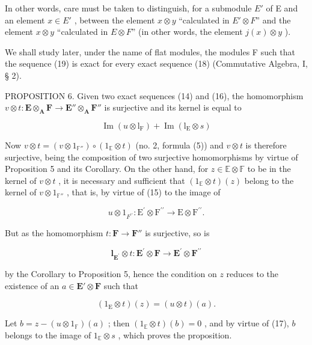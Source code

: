 In other words, care must be taken to distinguish, for a submodule \(E'\) of E and an element \(x \in E'\) , between the element \(x \otimes y\) ``calculated in \(E' \otimes F\)'' and the element \(x \otimes y\) ``calculated in \(E \otimes F\)'' (in other words, the element \(j(x) \otimes y\) ).

We shall study later, under the name of flat modules, the modules F such that the sequence (19) is exact for every exact sequence (18) (Commutative Algebra, I, § 2).

PROPOSITION 6. Given two exact sequences (14) and (16), the homomorphism \(v \otimes t: \mathbf{E} \otimes_{\mathbf{A}} \mathbf{F} \to \mathbf{E}'' \otimes_{\mathbf{A}} \mathbf{F}''\) is surjective and its kernel is equal to

\[
\operatorname{Im} (u \otimes \mathrm{l} _ {\mathrm{F}}) + \operatorname{Im} (\mathrm{l} _ {\mathrm{E}} \otimes s)
\]

Now \(v \otimes t = (v \otimes 1_{\mathbb{F}''}) \circ (1_{\mathbb{E}} \otimes t)\) (no. 2, formula (5)) and \(v \otimes t\) is therefore surjective, being the composition of two surjective homomorphisms by virtue of Proposition 5 and its Corollary. On the other hand, for \(z \in \mathbb{E} \otimes \mathbb{F}\) to be in the kernel of \(v \otimes t\) , it is necessary and sufficient that \((1_{\mathbb{E}} \otimes t) (z)\) belong to the kernel of \(v \otimes 1_{\mathbb{F}''}\) , that is, by virtue of (15) to the image of

\[
u \otimes 1 _ {F ^ {\prime \prime}}: \mathrm{E} ^ {\prime} \otimes \mathrm{F} ^ {\prime \prime} \rightarrow \mathrm{E} \otimes \mathrm{F} ^ {\prime \prime}.
\]

But as the homomorphism \(t: \mathbf{F} \to \mathbf{F}''\) is surjective, so is

\[
\mathbf {l} _ {\mathbf {E} ^ {\prime}} \otimes t: \mathbf {E} ^ {\prime} \otimes \mathbf {F} \rightarrow \mathbf {E} ^ {\prime} \otimes \mathbf {F} ^ {\prime \prime}
\]

by the Corollary to Proposition 5, hence the condition on \(z\) reduces to the existence of an \(a \in \mathbf{E}' \otimes \mathbf{F}\) such that

\[
(1 _ {\mathrm{E}} \otimes t) (z) = (u \otimes t) (a).
\]

Let \(b = z - (u \otimes 1_{\mathbb{F}})(a)\) ; then \((1_{\mathbb{E}} \otimes t)(b) = 0\) , and by virtue of (17), \(b\) belongs to the image of \(1_{\mathbb{E}} \otimes s\) , which proves the proposition.

